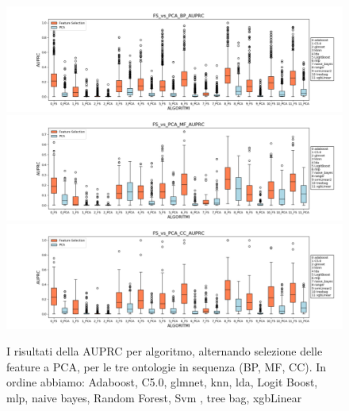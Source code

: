 \documentclass[12pt]{report}
\begin{document}
\begin{figure}[h!]
\centering
\hspace*{-0.9in}
\includegraphics[scale=0.43]{./images/FS_vs_PCA_BP_AUPRC.png}
\hspace*{-0.9in}
\includegraphics[scale=0.43]{./images/FS_vs_PCA_MF_AUPRC.png}
\hspace*{-0.9in}
\includegraphics[scale=0.43]{./images/FS_vs_PCA_CC_AUPRC.png}
\caption{\footnotesize{I risultati della AUPRC per algoritmo, alternando selezione delle feature a PCA, per le tre ontologie in sequenza (BP, MF, CC). In ordine abbiamo: Adaboost, C5.0, glmnet, knn, lda, Logit Boost, mlp, naive bayes, Random Forest, Svm , tree bag, xgbLinear}}
\label{versusAUPRC}
\end{figure}
\end{document}
